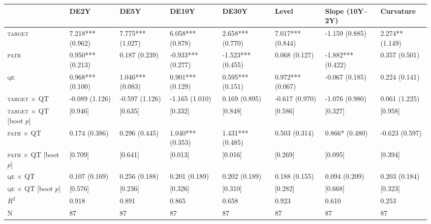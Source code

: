\begin{tabular}{llllllll}
\toprule
 & DE2Y & DE5Y & DE10Y & DE30Y & Level & Slope (10Y--2Y) & Curvature \\
\midrule
\textsc{target} & 7.218*** (0.962) & 7.775*** (1.027) & 6.058*** (0.878) & 2.658*** (0.770) & 7.017*** (0.844) & -1.159 (0.885) & 2.274** (1.149) \\
\textsc{path} & 0.950*** (0.213) & 0.187 (0.239) & -0.933*** (0.277) & -1.523*** (0.455) & 0.068 (0.127) & -1.882*** (0.422) & 0.357 (0.501) \\
\textsc{qe} & 0.968*** (0.100) & 1.046*** (0.083) & 0.901*** (0.129) & 0.595*** (0.151) & 0.972*** (0.067) & -0.067 (0.185) & 0.224 (0.141) \\
\textsc{target} $\times$ QT & -0.089 (1.126) & -0.597 (1.126) & -1.165 (1.010) & 0.169 (0.895) & -0.617 (0.970) & -1.076 (0.980) & 0.061 (1.225) \\
\textsc{target} $\times$ QT [boot $p$] & [0.946] & [0.635] & [0.332] & [0.848] & [0.586] & [0.327] & [0.958] \\
\textsc{path} $\times$ QT & 0.174 (0.386) & 0.296 (0.445) & 1.040*** (0.353) & 1.431*** (0.485) & 0.503 (0.314) & 0.866* (0.480) & -0.623 (0.597) \\
\textsc{path} $\times$ QT [boot $p$] & [0.709] & [0.641] & [0.013] & [0.016] & [0.269] & [0.095] & [0.394] \\
\textsc{qe} $\times$ QT & 0.107 (0.169) & 0.256 (0.188) & 0.201 (0.189) & 0.202 (0.189) & 0.188 (0.155) & 0.094 (0.209) & 0.203 (0.184) \\
\textsc{qe} $\times$ QT [boot $p$] & [0.576] & [0.236] & [0.326] & [0.310] & [0.282] & [0.668] & [0.323] \\
$R^2$ & 0.918 & 0.891 & 0.865 & 0.658 & 0.923 & 0.610 & 0.253 \\
N & 87 & 87 & 87 & 87 & 87 & 87 & 87 \\
\bottomrule
\end{tabular}
